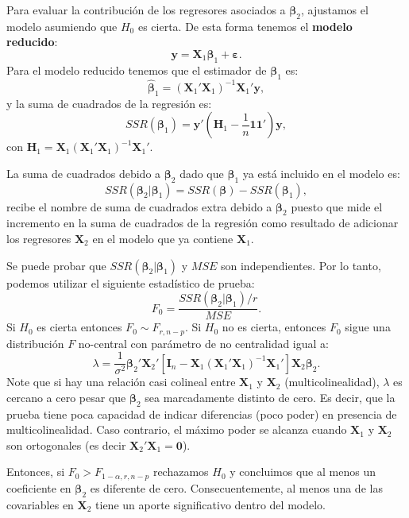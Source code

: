 \documentclass[
]{article}
\begin{document}
Para evaluar la contribución de los regresores asociados a \(\boldsymbol \beta_{2}\), ajustamos el modelo asumiendo que \(H_{0}\) es cierta. De esta forma tenemos el \textbf{modelo reducido}:
\[
\boldsymbol y= \boldsymbol X_{1}\boldsymbol \beta_{1} + \boldsymbol \varepsilon.
\]
Para el modelo reducido tenemos que el estimador de \(\boldsymbol \beta_{1}\) es:
\[
\widehat{\boldsymbol \beta}_{1} = (\boldsymbol X_{1}'\boldsymbol X_{1})^{-1}\boldsymbol X_{1}'\boldsymbol y,
\]
y la suma de cuadrados de la regresión es:
\[
SSR(\boldsymbol \beta_{1}) = \boldsymbol y'(\boldsymbol H_1 - \frac{1}{n}\boldsymbol 1\boldsymbol 1')\boldsymbol y,
\]
con \(\boldsymbol H_1 = \boldsymbol X_1(\boldsymbol X_1'\boldsymbol X_1)^{-1}\boldsymbol X_1'\).

La suma de cuadrados debido a \(\boldsymbol \beta_{2}\) dado que \(\boldsymbol \beta_{1}\) ya está incluido en el modelo es:
\[
SSR(\boldsymbol \beta_{2}| \boldsymbol \beta_{1}) = SSR(\boldsymbol \beta) - SSR(\boldsymbol \beta_{1}),
\]
recibe el nombre de suma de cuadrados extra debido a \(\boldsymbol \beta_2\) puesto que mide el incremento en la suma de cuadrados de la regresión como resultado de adicionar los regresores \(\boldsymbol X_{2}\) en el modelo que ya contiene \(\boldsymbol X_{1}\).

Se puede probar que \(SSR(\boldsymbol \beta_{2}| \boldsymbol \beta_{1})\) y \(MSE\) son independientes. Por lo tanto, podemos utilizar el siguiente estadístico de prueba:
\[
F_{0} = \frac{SSR(\boldsymbol \beta_{2}|\boldsymbol \beta_{1})/r}{MSE}.
\]
Si \(H_{0}\) es cierta entonces \(F_{0} \sim F_{r,n-p}\). Si \(H_{0}\) no es cierta, entonces \(F_{0}\) sigue una distribución \(F\) no-central con parámetro de no centralidad igual a:
\[
\lambda = \frac{1}{\sigma^{2}}\boldsymbol \beta_{2}'\boldsymbol X_{2}'\left[ \boldsymbol I_{n} - \boldsymbol X_{1}(\boldsymbol X_{1}'\boldsymbol X_{1})^{-1}\boldsymbol X_{1}'\right]\boldsymbol X_{2}\boldsymbol \beta_{2}.
\]
Note que si hay una relación casi colineal entre \(\boldsymbol X_{1}\) y \(\boldsymbol X_{2}\) (multicolinealidad), \(\lambda\) es cercano a cero pesar que \(\boldsymbol \beta_{2}\) sea marcadamente distinto de cero. Es decir, que la prueba tiene poca capacidad de indicar diferencias (poco poder) en presencia de multicolinealidad. Caso contrario, el máximo poder se alcanza cuando \(\boldsymbol X_{1}\) y \(\boldsymbol X_{2}\) son ortogonales (es decir \(\boldsymbol X_{2}'\boldsymbol X_{1} = \boldsymbol 0\)).

Entonces, si \(F_{0} > F_{1-\alpha,r,n-p}\) rechazamos \(H_{0}\) y concluimos que al menos un coeficiente en \(\boldsymbol \beta_{2}\) es diferente de cero. Consecuentemente, al menos una de las covariables en \(\boldsymbol X_{2}\) tiene un aporte significativo dentro del modelo.
\end{document}
